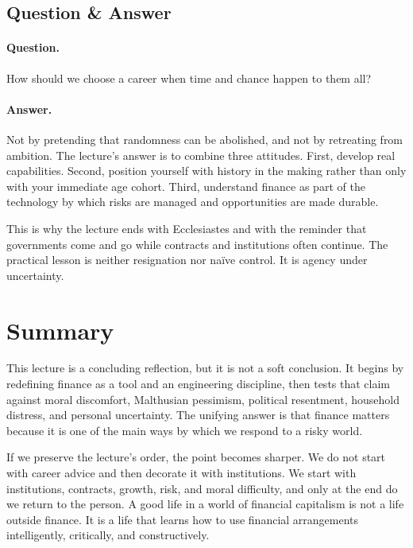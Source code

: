 \subsection{Question \& Answer}

\paragraph{Question.} How should we choose a career when time and chance happen to them all?

\paragraph{Answer.} Not by pretending that randomness can be abolished, and not by retreating from ambition. The lecture's answer is to combine three attitudes. First, develop real capabilities. Second, position yourself with history in the making rather than only with your immediate age cohort. Third, understand finance as part of the technology by which risks are managed and opportunities are made durable.

This is why the lecture ends with Ecclesiastes and with the reminder that governments come and go while contracts and institutions often continue. The practical lesson is neither resignation nor naïve control. It is agency under uncertainty.

\section{Summary}

This lecture is a concluding reflection, but it is not a soft conclusion. It begins by redefining finance as a tool and an engineering discipline, then tests that claim against moral discomfort, Malthusian pessimism, political resentment, household distress, and personal uncertainty. The unifying answer is that finance matters because it is one of the main ways by which we respond to a risky world.

If we preserve the lecture's order, the point becomes sharper. We do not start with career advice and then decorate it with institutions. We start with institutions, contracts, growth, risk, and moral difficulty, and only at the end do we return to the person. A good life in a world of financial capitalism is not a life outside finance. It is a life that learns how to use financial arrangements intelligently, critically, and constructively.